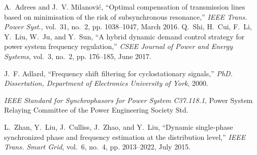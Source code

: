 \documentclass[journal,twoside]{IEEEtran}
\begin{document}
\begin{thebibliography}{10}
	A.~Adrees and J.~V. Milanović, ``Optimal compensation of transmission lines
	based on minimisation of the risk of subsynchronous resonance,'' \emph{IEEE
		Trans. Power Syst.}, vol.~31, no.~2, pp. 1038--1047, March 2016.
	Q.~Shi, H.~Cui, F.~Li, Y.~Liu, W.~Ju, and Y.~Sun, ``A hybrid dynamic demand
	control strategy for power system frequency regulation,'' \emph{CSEE Journal
		of Power and Energy Systems}, vol.~3, no.~2, pp. 176--185, June 2017.
	
	J.~F. Adlard, ``Frequency shift filtering for cyclostationary signals,''
	\emph{PhD. Dissertation, Department of Electronics University of York}, 2000.
	
	\emph{IEEE Standard for Synchrophasors for Power System C37.118.1}, Power
	System Relaying Committee of the Power Engineering Society Std.
	
	L.~Zhan, Y.~Liu, J.~Culliss, J.~Zhao, and Y.~Liu, ``Dynamic single-phase
	synchronized phase and frequency estimation at the distribution level,''
	\emph{IEEE Trans. Smart Grid}, vol.~6, no.~4, pp. 2013--2022, July 2015.
	
\end{thebibliography}
\end{document}
